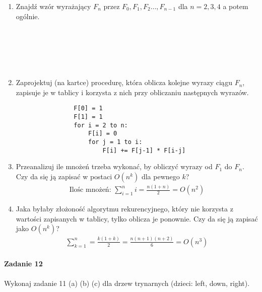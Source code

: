 \documentclass[18pt]{extarticle}
\begin{document}
\begin{enumerate}[label=(\alph*)]
    \item Znajdź wzór wyrażający $F_n$ przez $F_0, F_1, F_2 \dots, F_{n-1}$ dla $n = 2, 3, 4$ a potem ogólnie. \\
         \\
         \\
         \\
         \\
         \\
    \item Zaprojektuj (na kartce) procedurę, która oblicza kolejne wyrazy ciągu $F_n$, zapisuje
          je w tablicy i korzysta z nich przy obliczaniu następnych wyrazów.
          \begin{lstlisting}
                F[0] = 1
                F[1] = 1
                for i = 2 to n:
                    F[i] = 0
                    for j = 1 to i:
                        F[i] += F[j-1] * F[i-j]
          \end{lstlisting}
    \item Przeanalizuj ile mnożeń trzeba wykonać, by obliczyć wyrazy od $F_1$ do $F_n$. Czy da
          się ją zapisać w postaci $O(n^k)$ dla pewnego $k$?
          \begin{gather*}
                \text{Ilośc mnożeń: } \sum_{i=1}^{n} i = \frac{n(1+n)}{2} = O(n^2)
          \end{gather*}
    \item Jaka byłaby złożoność algorytmu rekurencyjnego, który nie korzysta z wartości
          zapisanych w tablicy, tylko oblicza je ponownie. Czy da się ją zapisać jako $O(n^k)$?
          \begin{gather*}
                \sum_{k=1}^{n} = \frac{k(1+k)}{2} = \frac{n(n+1)(n+2)}{6} = O(n^3)
          \end{gather*}
\end{enumerate}

\paragraph{Zadanie 12} Wykonaj zadanie 11 (a) (b) (c) dla drzew trynarnych (dzieci: left, down, right).
\end{document}
